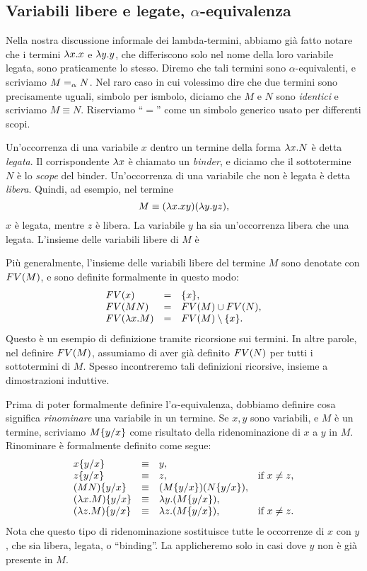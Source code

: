 \documentclass{article}
\begin{document}
\subsection{Variabili libere e legate, $\alpha$-equivalenza}

Nella nostra discussione informale dei lambda-termini, abbiamo gi\`a fatto
notare che i termini $\lambda x.x$ e $\lambda y.y$, che differiscono solo nel
nome della loro variabile legata, sono praticamente lo stesso. Diremo che
tali termini sono $\alpha$-equivalenti, e scriviamo $M=_{\alpha} N$. Nel raro
caso in cui volessimo dire che due termini sono precisamente uguali, simbolo
per ismbolo, diciamo che $M$ e $N$ sono {\em identici} e scriviamo $M\equiv N$.
Riserviamo ``$=$'' come un simbolo generico usato per differenti scopi.

Un'occorrenza di una variabile $x$ dentro un termine della forma $\lambda x.N$
\`e detta {\em legata}. Il corrispondente $\lambda x$ \`e chiamato un {\em binder}, e
diciamo che il sottotermine $N$ \`e lo {\em scope} del binder. Un'occorrenza di
una variabile che non \`e legata \`e detta {\em libera}. Quindi,
ad esempio, nel termine
\[   M \equiv (\lambda x.xy)(\lambda y.yz), \]
$x$ \`e legata, mentre $z$ \`e libera. La variabile $y$ ha sia un'occorrenza libera
che una legata. L'insieme delle variabili libere di $M$ \`e

Pi\`u generalmente, l'insieme delle variabili libere del termine $M$ sono
denotate con $FV(M)$, e sono definite formalmente in questo modo:
\[ \begin{array}{lll}
  FV(x) &=& \{x\}, \\
  FV(MN) &=& FV(M)\cup FV(N), \\
  FV(\lambda x.M) &=& FV(M) \setminus \{x\}.
\end{array}
\]
Questo \`e un esempio di definizione tramite ricorsione sui termini. In
altre parole, nel definire $FV(M)$, assumiamo di aver gi\`a definito
$FV(N)$ per tutti i sottotermini di $M$. Spesso incontreremo tali
definizioni ricorsive, insieme a dimostrazioni induttive.

Prima di poter formalmente definire l'$\alpha$-equivalenza, dobbiamo definire
cosa significa {\em rinominare} una variabile in un termine. Se $x,y$ sono
variabili, e $M$ \`e un termine, scriviamo $M\{y/x\}$ come risultato della
ridenominazione di $x$ a $y$ in $M$. Rinominare \`e formalmente definito come segue:
\[ \begin{array}{llll}
  x\{y/x\} &\equiv& y, \\
  z\{y/x\} &\equiv& z, & \mbox{if $x\neq z$,} \\
  (MN)\{y/x\} &\equiv& (M\{y/x\})(N\{y/x\}), \\
  (\lambda x.M)\{y/x\} &\equiv& \lambda y.(M\{y/x\}), \\
  (\lambda z.M)\{y/x\} &\equiv& \lambda z.(M\{y/x\}), & \mbox{if
  $x\neq z$.}
\end{array}
\]
Nota che questo tipo di ridenominazione sostituisce tutte le occorrenze di $x$ con
$y$, che sia libera, legata, o ``binding''. La applicheremo solo in casi dove
$y$ non \`e gi\`a presente in $M$.
\end{document}
